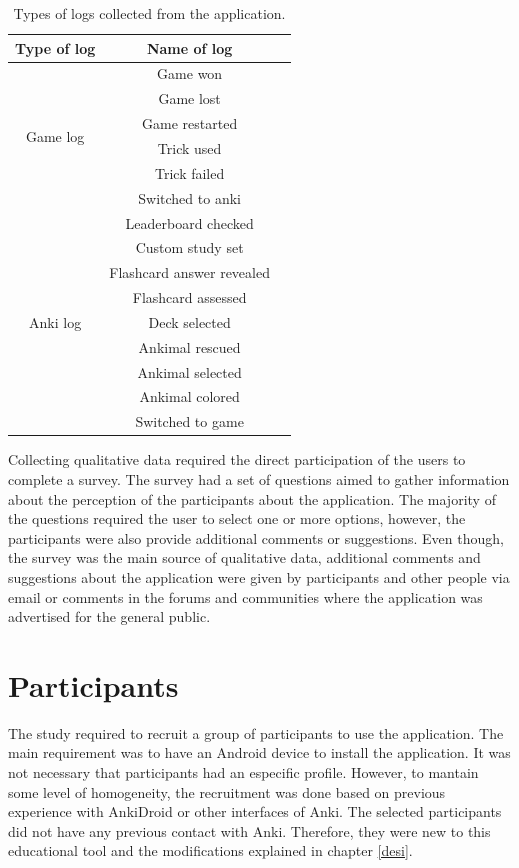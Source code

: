 \begin{table}[!htb]
	\centering
	{\renewcommand{\arraystretch}{2}
		\begin{tabular}{ |c|c|c| }
			\hline
			\textbf{Type of log} & \textbf{Name of log} \\
			\hline
			\multirow{6}{3cm}{Game log} &  Game won\\
			& Game lost \\
			& Game restarted \\
			& Trick used \\
			& Trick failed \\
			& Switched to anki \\
			\hline
			\multirow{9}{3cm}{Anki log} &  Leaderboard checked\\
			& Custom study set \\
			& Flashcard answer revealed\\
			& Flashcard assessed \\
			& Deck selected \\
			& Ankimal rescued\\
			& Ankimal selected\\
			& Ankimal colored\\
			& Switched to game \\
			\hline
		\end{tabular}
	}
	\caption{Types of logs collected from the application.}
	\label{tab:log-types}
\end{table}

Collecting qualitative data required the direct participation of the users to complete a survey. The survey had a set of questions aimed to gather information about the perception of the participants about the application. The majority of the questions required the user to select one or more options, however, the participants were also provide additional comments or suggestions. Even though, the survey was the main source of qualitative data, additional comments and suggestions about the application were given by participants and other people via email or comments in the forums and communities where the application was advertised for the general public.


\section{Participants}
\label{participants}
The study required to recruit a group of participants to use the application. The main requirement was to have an Android device to install the application. It was not necessary that participants had an especific profile. However, to mantain some level of homogeneity, the recruitment was done based on previous experience with AnkiDroid or other interfaces of Anki. The selected participants did not have any previous contact with Anki. Therefore, they were new to this educational tool and the modifications explained in chapter \ref{desi}.

